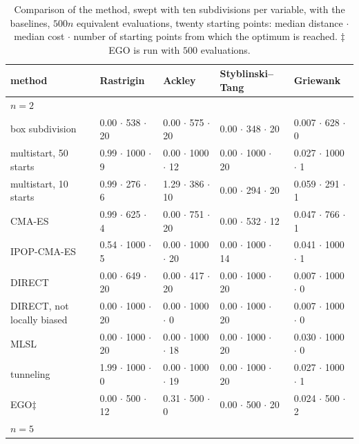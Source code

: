 \begin{table}[t]
  \centering
  \caption{Comparison of the method, swept with ten subdivisions per
    variable, with the baselines, $500n$ equivalent evaluations, twenty
    starting points: median distance $\cdot$ median cost $\cdot$ number of
    starting points from which the optimum is reached. $\ddagger$ EGO is
    run with $500$ evaluations.}
  \label{tab:baselines}
  \scriptsize
  \setlength{\tabcolsep}{2.5pt}
  \begin{tabular}{lllll}
    \toprule
    method & Rastrigin & Ackley & Styblinski--Tang & Griewank \\
    \midrule
    \multicolumn{5}{l}{$n = 2$} \\
    box subdivision & 0.00 $\cdot$ 538 $\cdot$ 20 & 0.00 $\cdot$ 575 $\cdot$ 20 & 0.00 $\cdot$ 348 $\cdot$ 20 & 0.007 $\cdot$ 628 $\cdot$ 0 \\
    multistart, 50 starts & 0.99 $\cdot$ 1000 $\cdot$ 9 & 0.00 $\cdot$ 1000 $\cdot$ 12 & 0.00 $\cdot$ 1000 $\cdot$ 20 & 0.027 $\cdot$ 1000 $\cdot$ 1 \\
    multistart, 10 starts & 0.99 $\cdot$ 276 $\cdot$ 6 & 1.29 $\cdot$ 386 $\cdot$ 10 & 0.00 $\cdot$ 294 $\cdot$ 20 & 0.059 $\cdot$ 291 $\cdot$ 1 \\
    CMA-ES & 0.99 $\cdot$ 625 $\cdot$ 4 & 0.00 $\cdot$ 751 $\cdot$ 20 & 0.00 $\cdot$ 532 $\cdot$ 12 & 0.047 $\cdot$ 766 $\cdot$ 1 \\
    IPOP-CMA-ES & 0.54 $\cdot$ 1000 $\cdot$ 5 & 0.00 $\cdot$ 1000 $\cdot$ 20 & 0.00 $\cdot$ 1000 $\cdot$ 14 & 0.041 $\cdot$ 1000 $\cdot$ 1 \\
    DIRECT & 0.00 $\cdot$ 649 $\cdot$ 20 & 0.00 $\cdot$ 417 $\cdot$ 20 & 0.00 $\cdot$ 1000 $\cdot$ 20 & 0.007 $\cdot$ 1000 $\cdot$ 0 \\
    DIRECT, not locally biased & 0.00 $\cdot$ 1000 $\cdot$ 20 & 0.00 $\cdot$ 1000 $\cdot$ 0 & 0.00 $\cdot$ 1000 $\cdot$ 20 & 0.007 $\cdot$ 1000 $\cdot$ 0 \\
    MLSL & 0.00 $\cdot$ 1000 $\cdot$ 20 & 0.00 $\cdot$ 1000 $\cdot$ 18 & 0.00 $\cdot$ 1000 $\cdot$ 20 & 0.030 $\cdot$ 1000 $\cdot$ 0 \\
    tunneling & 1.99 $\cdot$ 1000 $\cdot$ 0 & 0.00 $\cdot$ 1000 $\cdot$ 19 & 0.00 $\cdot$ 1000 $\cdot$ 20 & 0.027 $\cdot$ 1000 $\cdot$ 1 \\
    EGO$\ddagger$ & 0.00 $\cdot$ 500 $\cdot$ 12 & 0.31 $\cdot$ 500 $\cdot$ 0 & 0.00 $\cdot$ 500 $\cdot$ 20 & 0.024 $\cdot$ 500 $\cdot$ 2 \\
    \midrule
    \multicolumn{5}{l}{$n = 5$} \\

\end{tabular}
\end{table}
